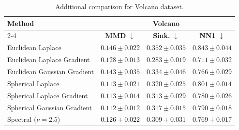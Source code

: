 \documentclass{article}
\theoremstyle{plain}
\newcommand{\best}[1]{\cellcolor{bestblue}#1}
\newcommand{\second}[1]{\cellcolor{secondblue}#1}
\newcommand{\third}[1]{\cellcolor{thirdgrayblue}#1}
\begin{document}
\begin{table}[h!]
\centering
\small
\setlength{\tabcolsep}{6pt}
\renewcommand{\arraystretch}{1.15}
\begin{tabular}{lccc}
\toprule
\textbf{Method} 
& \multicolumn{3}{c}{\textbf{Volcano}} \\
\cmidrule(lr){2-4} 
& \textbf{MMD} $\downarrow$ & \textbf{Sink.} $\downarrow$ & \textbf{NN1} $\downarrow$\\
\midrule

Euclidean Laplace {\tiny \cite{Deng_2026_Drift}}
& $0.146 \pm 0.022$ & $0.352 \pm 0.035$ & $0.843 \pm 0.044$ \\
\midrule
Euclidean Laplace Gradient
& {$0.128 \pm 0.013$} & \best{$0.283 \pm 0.019$} & \best{$0.711 \pm 0.032$} \\
Euclidean Gaussian Gradient
& $0.143 \pm 0.035$ & $0.334 \pm 0.046$ & \second{$0.766 \pm 0.029$} \\
Spherical Laplace
& \third{$0.113 \pm 0.021$} & $0.320 \pm 0.025$ & $0.801 \pm 0.014$ \\
Spherical Laplace Gradient
& \second{$0.113 \pm 0.014$} & \third{$0.313 \pm 0.029$} & $0.780 \pm 0.026$ \\
Spherical Gaussian Gradient
& \best{$0.112 \pm 0.012$} & {$0.317 \pm 0.015$} & $0.790 \pm 0.018$ \\
Spectral ($\nu = 2.5$)
& {$0.126 \pm 0.022$} & \second{$0.309 \pm 0.031$} & \third{$0.769 \pm 0.017$} \\

\bottomrule
\end{tabular}
\caption{Additional comparison for Volcano dataset.
}
\label{tab:volcano-full}
\end{table}
\end{document}
